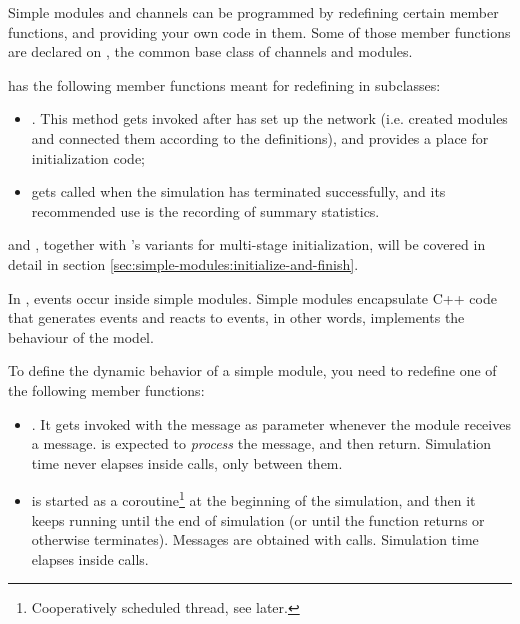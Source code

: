 Simple modules and channels can be programmed by redefining certain
member functions, and providing your own code in them. Some of those
member functions are declared on , the common base
class of channels and modules.

 has the following member functions meant for
redefining in subclasses:

\begin{itemize}
  \item {}. This method gets invoked after {\opp} has
    set up the network (i.e. created modules and connected them according
    to the definitions), and provides a place for initialization code;
  \item {} gets called when the simulation has terminated
    successfully, and its recommended use is the recording of summary
    statistics.
\end{itemize}

 and , together with 's
variants for multi-stage initialization, will be covered in detail in
section \ref{sec:simple-modules:initialize-and-finish}.


In {\opp}, events occur inside simple modules.
Simple modules encapsulate C++ code that generates events and reacts to events,
in other words, implements the behaviour of the model.

To define the dynamic behavior of a simple module, you need to redefine one
of the following member functions:

\begin{itemize}
  \item {}. It
     gets invoked with the message as parameter whenever the
     module receives a message.  is
     expected to \textit{process} the message, and then return.
     Simulation time never elapses inside 
     calls, only between them.
  \item {} is started as a coroutine\footnote{Cooperatively
     scheduled thread, see later.} at the beginning of the simulation, and
     then it keeps running until the end of simulation (or until the function
     returns or otherwise terminates). Messages are obtained with
      calls. Simulation time elapses inside
      calls.
\end{itemize}

